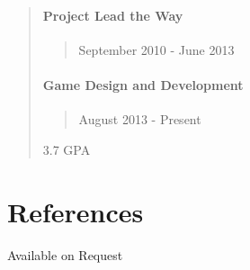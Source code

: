 \documentclass[line,margin]{res}
\begin{document}
\begin{resume}
\begin{quote}
\paragraph{Project Lead the Way}
\begin{quote}
September 2010 - June 2013
\end{quote}
\paragraph{Game Design and
Development}
\begin{quote}
August 2013 - Present
\end{quote}
3.7 GPA
\end{quote}
\section{References}
Available on Request
\end{resume}
\end{document}
